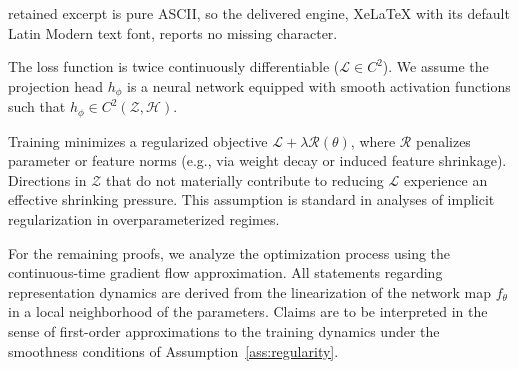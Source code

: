 \documentclass[10pt,a4paper]{amsart}
\begin{document}
retained excerpt is pure ASCII, so the delivered engine, XeLaTeX with its default Latin Modern text font, reports no missing character.
\begin{assumption}
\label{ass:regularity}
The loss function is twice continuously differentiable ($\mathcal{L} \in C^2$). We assume the projection head $h_\phi$ is a neural network equipped with smooth activation functions such that $h_\phi \in C^2(\mathcal{Z}, \mathcal{H})$. 
\end{assumption}

\begin{assumption}
\label{ass:min-norm}
Training minimizes a regularized objective $\mathcal{L} + \lambda \mathcal{R}(\theta)$, where $\mathcal{R}$ penalizes parameter or feature norms (e.g., via weight decay or induced feature shrinkage). Directions in $\mathcal{Z}$ that do not materially contribute to reducing $\mathcal{L}$ experience an effective shrinking pressure. This assumption is standard in analyses of implicit regularization in overparameterized regimes.
\end{assumption}

\begin{remark}
    \label{rem:gradient-flow-approx}
    For the remaining proofs, we analyze the optimization process using the continuous-time gradient flow approximation. All statements regarding representation dynamics are derived from the linearization of the network map $f_\theta$ in a local neighborhood of the parameters. Claims are to be interpreted in the sense of first-order approximations to the training dynamics under the smoothness conditions of Assumption~\ref{ass:regularity}.
\end{remark}
\end{document}
